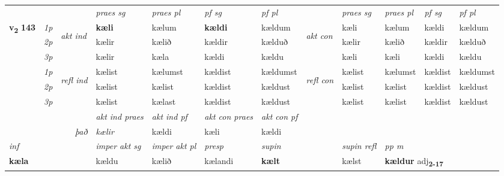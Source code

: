 \begin{longtable}[l]{X>{\footnotesize\itshape}llXXXXlXXXX}
 & &   & \textit{praes sg}  & \textit{praes pl}    & \textit{ pf sg} & \textit{pf pl} & & \textit{praes sg}  & \textit{praes pl}    & \textit{pf sg} & \textit{pf pl }  \\ \cmidrule{4-7} \cmidrule{9-12}
 \multirow{2}{*}{{{\textbf{v{\textsubscript{2}}} \Large{\textbf{143}}}}}  & 1p & \multirow{3}{*}{\begin{turn}{90}\textit{akt ind}\end{turn}} & \textbf{kæli} & kælum & \textbf{kældi} & kældum & \multirow{3}{*}{\begin{turn}{90}\textit{akt con}\end{turn}} &kæli & kælum & kældi & kældum\\*
 & 2p &  &  kælir  & kælið & kældir & kælduð & & kælir & kælið & kældir & kælduð \\*
 & 3p &  & kælir & kæla & kældi & kældu & & kæli & kæli& kældi & kældu \\*
\cmidrule{4-7} \cmidrule{9-12}
 & 1p & \multirow{3}{*}{\begin{turn}{90}\textit{refl ind}\end{turn}}  & kælist & kælumst & kældist & kældumst & \multirow{3}{*}{\begin{turn}{90}\textit{refl con}\end{turn}}  &kælist & kælumst & kældist & kældumst \\*
 & 2p &  & kælist & kælist & kældist & kældust & &kælist & kælist & kældist & kældust \\*
 & 3p  & & kælist & kælast & kældist & kældust & & kælist & kælist& kældist & kældust \\*
\cmidrule{4-7} \cmidrule{9-12}

   && &  \textit{akt ind praes} & \textit{akt ind pf} & \textit{akt con praes} & \textit{akt con pf} \\*
\multicolumn{3}{r}{\textit{það}} & kælir & kældi & kæli & kældi \\*

\cmidrule{4-7}
   {\textit{inf}} & &  & \textit{imper akt sg} & \textit{imper akt pl}   & \textit{presp} & \textit{supin} && \textit{supin refl} & \textit{pp m} \\*
  {\textbf{kæla}} & && kældu  & kælið   & kælandi &  \textbf{kælt} && kælst & \multicolumn{2}{l}{\textbf{kældur} adj\textbf{\textsubscript{2-17}}} \\*


\end{longtable}
